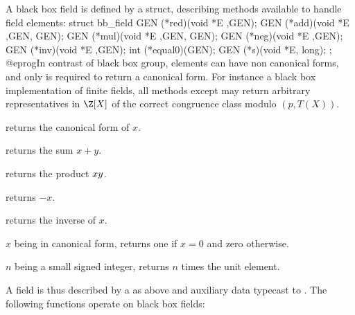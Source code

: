 A black box field is defined by a  struct, describing methods
available to handle field elements:
\bprog
  struct bb_field
  {
    GEN (*red)(void *E ,GEN);
    GEN (*add)(void *E ,GEN, GEN);
    GEN (*mul)(void *E ,GEN, GEN);
    GEN (*neg)(void *E ,GEN);
    GEN (*inv)(void *E ,GEN);
    int (*equal0)(GEN);
    GEN (*s)(void *E, long);
  };
@eprog\noindent In contrast of black box group, elements can have
non canonical forms, and only  is required to return a canonical form.
For instance a black box implementation of finite fields, all methods
except  may return arbitrary representatives in $\Z[X]$ of the
correct congruence class modulo $(p,T(X))$.

 returns the canonical form of $x$.

 returns the sum $x+y$.

 returns the product $x\*y$.

 returns $-x$.

 returns the inverse of $x$.

 $x$ being in canonical form, returns one if $x=0$ and zero
otherwise.

 $n$ being a small signed integer, returns $n$ times the unit element.

\noindent A field is thus described by a  as above and
auxiliary data typecast to . The following functions operate on
black box fields:










